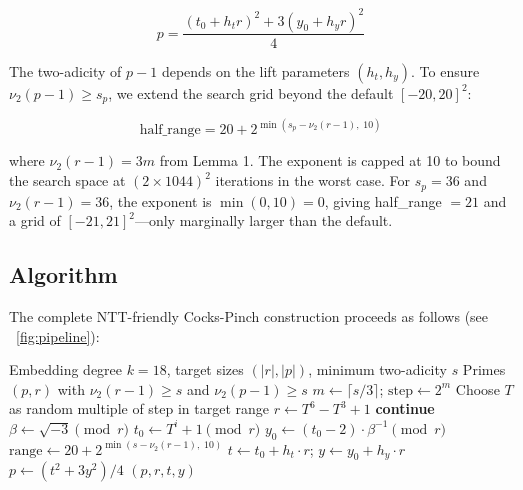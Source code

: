 \[p = \frac{(t_0 + h_t r)^2 + 3(y_0 + h_y r)^2}{4}\]

The two-adicity of \(p-1\) depends on the lift parameters
\((h_t, h_y)\). To ensure \(\nu_2(p-1) \geq s_p\), we extend the search
grid beyond the default \([-20, 20]^2\):

\[\text{half\_range} = 20 + 2^{\min(s_p - \nu_2(r-1),\; 10)}\]

where \(\nu_2(r-1) = 3m\) from Lemma 1. The exponent is capped at 10 to
bound the search space at \((2 \times 1044)^2\) iterations in the worst
case. For \(s_p = 36\) and \(\nu_2(r-1) = 36\), the exponent is
\(\min(0, 10) = 0\), giving half\_range \(= 21\) and a grid of
\([-21, 21]^2\)---only marginally larger than the default.

\subsection{Algorithm}\label{algorithm}

The complete NTT-friendly Cocks-Pinch construction proceeds as follows
(see \figurename~\ref{fig:pipeline}):



\begin{algorithm}[t]
\caption{NTT-friendly Cocks-Pinch Construction}
\label{alg:ntt-cp}
\begin{algorithmic}[1]
\REQUIRE Embedding degree $k=18$, target sizes $(|r|, |p|)$, minimum two-adicity $s$
\ENSURE Primes $(p, r)$ with $\nu_2(r-1) \geq s$ and $\nu_2(p-1) \geq s$
\STATE $m \leftarrow \lceil s/3 \rceil$; \quad $\text{step} \leftarrow 2^m$
\REPEAT
    \STATE Choose $T$ as random multiple of step in target range
    \STATE $r \leftarrow T^6 - T^3 + 1$
        \STATE \textbf{continue}
    \ENDIF
    \STATE $\beta \leftarrow \sqrt{-3} \pmod{r}$ 
        \STATE $t_0 \leftarrow T^i + 1 \pmod{r}$
        \STATE $y_0 \leftarrow (t_0 - 2) \cdot \beta^{-1} \pmod{r}$
        \STATE $\text{range} \leftarrow 20 + 2^{\min(s - \nu_2(r-1),\; 10)}$
            \STATE $t \leftarrow t_0 + h_t \cdot r$; \quad $y \leftarrow y_0 + h_y \cdot r$
            \STATE $p \leftarrow (t^2 + 3y^2) / 4$
                \RETURN $(p, r, t, y)$
            \ENDIF
        \ENDFOR
    \ENDFOR
{}
\end{algorithmic}
\end{algorithm}

